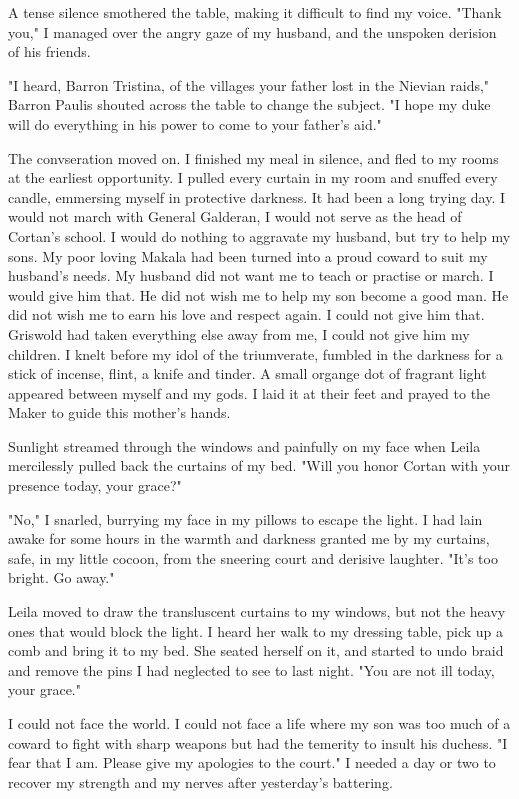 \documentclass{article}
\begin{document}
A tense silence smothered the table, making it difficult to find my voice. "Thank you," I managed over the angry gaze of my husband, and the unspoken derision of his friends. 

"I heard, Barron Tristina, of the villages your father lost in the Nievian raids," Barron Paulis shouted across the table to change the subject. "I hope my duke will do everything in his power to come to your father's aid." 

The convseration moved on. I finished my meal in silence, and fled to my rooms at the earliest opportunity. I pulled every curtain in my room and snuffed every candle, emmersing myself in protective darkness. It had been a long trying day. I would not march with General Galderan, I would not serve as the head of Cortan's school. I would do nothing to aggravate my husband, but try to help my sons. My poor loving Makala had been turned into a proud coward to suit my husband's needs. My husband did not want me to teach or practise or march. I would give him that. He did not wish me to help my son become a good man. He did not wish me to earn his love and respect again. I could not give him that. Griswold had taken everything else away from me, I could not give him my children. I knelt before my idol of the triumverate, fumbled in the darkness for a stick of incense, flint, a knife and tinder. A small organge dot of fragrant light appeared between myself and my gods. I laid it at their feet and prayed to the Maker to guide this mother's hands. 

\vspace{.5cm}

Sunlight streamed through the windows and painfully on my face when Leila mercilessly pulled back the curtains of my bed. "Will you honor Cortan with your presence today, your grace?"

"No," I snarled, burrying my face in my pillows to escape the light. I had lain awake for some hours in the warmth and darkness granted me by my curtains, safe,  in my little cocoon, from the sneering court and derisive laughter. "It's too bright. Go away."

Leila moved to draw the transluscent curtains to my windows, but not the heavy ones that would block the light. I heard her walk to my dressing table, pick up a comb and bring it to my bed. She seated herself on it, and started to undo braid and remove the pins I had neglected to see to last night. "You are not ill today, your grace."

I could not face the world. I could not face a life where my son was too much of a coward to fight with sharp weapons but had the temerity to insult his duchess. "I fear that I am. Please give my apologies to the court." I needed a day or two to recover my strength and my nerves after yesterday's battering.
\end{document}
